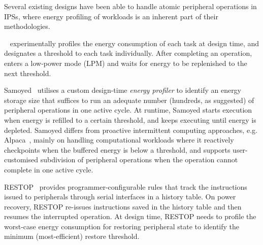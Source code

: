 
Several existing designs have been able to handle atomic peripheral operations in IPSs, where energy profiling of workloads is an inherent part of their methodologies.

\debs{}~\cite{gomez2016dynamic} experimentally profiles the energy consumption of each task at design time, and designates a threshold to each task individually.
After completing an operation, \debs{} enters a low-power mode (LPM) and waits for energy to be replenished to the next threshold. 

Samoyed~\cite{maeng2019supporting} utilises a custom design-time \textit{energy profiler} to identify an energy storage size that suffices to run an adequate number (hundreds, as suggested) of peripheral operations in one active cycle. 
At runtime, Samoyed starts execution when energy is refilled to a certain threshold, and keeps executing until energy is depleted. 
Samoyed differs from proactive intermittent computing approaches, e.g. Alpaca~\cite{maeng2017alpaca}, mainly on handling computational workloads where it reactively checkpoints when the buffered energy is below a threshold, and supports user-customised subdivision of peripheral operations when the operation cannot complete in one active cycle. 

RESTOP~\cite{rodriguez2018restop} provides programmer-configurable rules that track the instructions issued to peripherals through serial interfaces in a history table.
On power recovery, RESTOP re-issues instructions saved in the history table and then resumes the interrupted operation. 
At design time, RESTOP needs to profile the worst-case energy consumption for restoring peripheral state to identify the minimum (most-efficient) restore threshold. 

